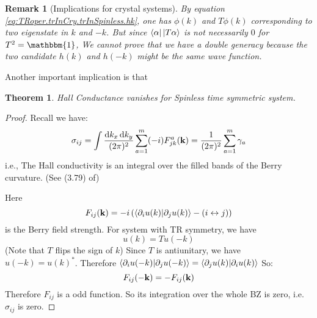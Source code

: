 \documentclass{article}
\newcommand*\diff{\mathop{}\!\mathrm{d}}
\numberwithin{equation}{subsection} %
\newtheorem{thm}{Theorem}[section]
\newtheorem{remark}{Remark}[section]
\theoremstyle{definition}
\begin{document}
        \begin{remark}[Implications for crystal systems]
            By equation \ref{eq:TRoper.trInCry.trInSpinless.hk}, one has
            $\phi(k)$ and $T\phi(k)$ corresponding to two eigenstate in
            $k$ and $-k$. But since $\bra{\alpha}\ket{T\alpha}$ is not
            necessarily $0$ for $T^2= \mathbbm{1}$, We cannot prove
            that we have a double generacy because the two candidate
            $h(k)$ and $h(-k)$ might be the same wave function.
        \end{remark}

        Another important implication is that
        \begin{thm}
            Hall Conductance vanishes for Spinless time
            symmetric system.  
        \end{thm}
        \begin{proof}
            Recall we have:
            \begin{align}
                \sigma_{ij} = \int \frac{\diff k_x\diff k_y}{(2\pi)^2}
                \sum_{a=1}^{m} (-i) F_{jk}^a(\vb{k})
                = \frac{1}{(2\pi)^2} \sum_{a=1}^m \gamma_a
            \end{align}
            i.e., The Hall conductivity is an integral over the filled
            bands of the Berry curvature. (See (3.79) of\cite{bernevig})

            Here 
            $$F_{ij}(\vb{k}) = -i \left( \braket{\partial_i
            u(k)|\partial_j u(k)} - (i\leftrightarrow j) \right)$$
            is the Berry field strength.
            For system with TR symmetry, we have
            $$ u(k) = T u(-k)$$
            (Note that $T$ flips the sign of $k$) Since $T$ is
            antiunitary, we have $ u(-k) = u(k)^*$. Therefore
            $\braket{\partial_i u(-k)|\partial_j u(-k)} = 
              \braket{\partial_j u(k)|\partial_i u(k)}$
            So:
            \begin{equation}
                F_{ij}(\vb{-k}) = - F_{ij}(\vb{k})
            \end{equation}
            Therefore $F_{ij}$ is a odd function. So its integration
            over the whole BZ is zero, i.e. $\sigma_{ij}$ is zero.
        \end{proof}
\end{document}
